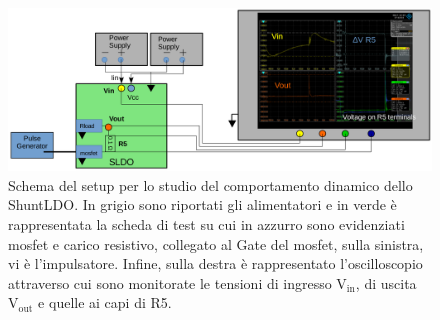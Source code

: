 \begin{figure}[!htb]
\centering
\includegraphics[scale=.3]{Immagini/SetupScheme}
\caption{Schema del setup per lo studio del comportamento dinamico dello ShuntLDO. In grigio sono riportati gli alimentatori e in verde è rappresentata la scheda di test su cui in azzurro sono evidenziati mosfet e carico resistivo, collegato al Gate del mosfet, sulla sinistra, vi è l'impulsatore. Infine, sulla destra è rappresentato l'oscilloscopio attraverso cui sono monitorate le tensioni di ingresso $\mathrm{V_{in}}$, di uscita $\mathrm{V_{out}}$ e quelle ai capi di R5.}
\label{Setupscheme}
\end{figure}


